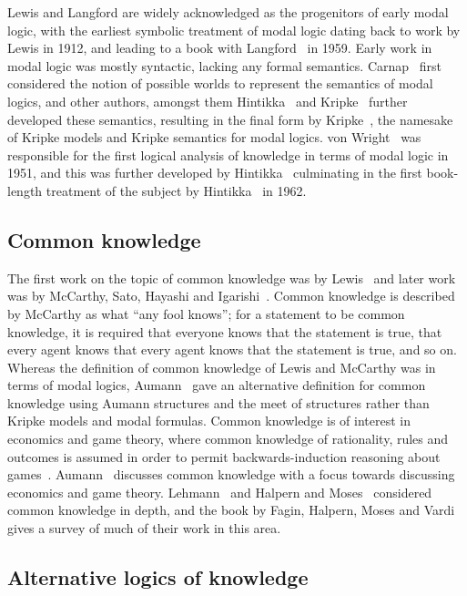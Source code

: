 Lewis and Langford are widely acknowledged as the progenitors of early modal logic, with the earliest symbolic treatment of modal logic dating back to work by Lewis in 1912, and leading to a book with Langford~\cite{langford:1959} in 1959.
Early work in modal logic was mostly syntactic, lacking any formal semantics.
Carnap~\cite{carnap:1946, carnap:1947} first considered the notion of possible worlds to represent the semantics of modal logics, and other authors, amongst them Hintikka~\cite{hintikka:1957, hintikka:1961} and Kripke~\cite{kripke:1959} further developed these semantics, resulting in the final form by Kripke~\cite{kripke:1963}, the namesake of Kripke models and Kripke semantics for modal logics.
von Wright~\cite{vonwright:1951} was responsible for the first logical analysis of knowledge in terms of modal logic in 1951, and this was further developed by Hintikka~\cite{hintikka:1957,hintikka:1961} culminating in the first book-length treatment of the subject by Hintikka~\cite{hintikka:1962} in 1962.

\subsection{Common knowledge}

The first work on the topic of common knowledge was by Lewis~\cite{lewis:1969} and later work was by McCarthy, Sato, Hayashi and Igarishi~\cite{mccarthy:1979}.
Common knowledge is described by McCarthy as what ``any fool knows''; for a statement to be common knowledge, it is required that everyone knows that the statement is true, that every agent knows that every agent knows that the statement is true, and so on.
Whereas the definition of common knowledge of Lewis and McCarthy was in terms of modal logics, Aumann~\cite{aumann:1976} gave an alternative definition for common knowledge using Aumann structures and the meet of structures rather than Kripke models and modal formulas.
Common knowledge is of interest in economics and game theory, where common knowledge of rationality, rules and outcomes is assumed in order to permit backwards-induction reasoning about games~\cite{aumann:1995}.
Aumann~\cite{aumann:1976} discusses common knowledge with a focus towards discussing economics and game theory. 
Lehmann~\cite{lehmann:1984} and Halpern and Moses~\cite{halpern:1985} considered common knowledge in depth, and the book by Fagin, Halpern, Moses and Vardi~\cite{fagin:1995} gives a survey of much of their work in this area.

\subsection{Alternative logics of knowledge}

